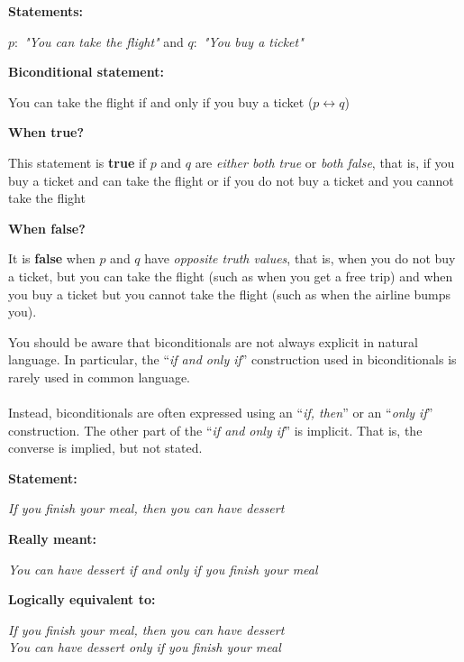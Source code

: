 \begin{tcolorbox}[title=Example of biconditional statement]
\textbf{Statements:}  
\begin{center}
$p:$ \textit{"You can take the flight"} and   $q:$ \textit{"You buy a ticket"}
\end{center}
\textbf{Biconditional statement:}
\begin{center}
You can take the flight if and only if you buy a ticket ($p \leftrightarrow q$)     
\end{center}
\textbf{When true?}
\begin{center}
This statement is \textbf{true} if $p$ and $q$ are \textit{either both true} or \textit{both false}, that is, if you buy a ticket and can take the flight or if you do not buy a ticket and you cannot take the flight     
\end{center}
\textbf{When false?} 
\begin{center}
It is \textbf{false} when
$p$ and $q$ have \textit{opposite truth values}, that is, when you do not buy a ticket, but you can take the flight (such as when you get a free trip) and when you buy a ticket but you cannot take the flight
(such as when the airline bumps you).   
\end{center}
\end{tcolorbox}
\begin{tcolorbox}[colback=white, colframe=gray!60, title=Remark 4]
You should be aware that biconditionals are not always explicit in natural language. In particular, the “\textit{if and only if}” construction used in biconditionals is rarely used in common language. \\ \\ Instead, biconditionals are often expressed
using an “\textit{if, then}” or an “\textit{only if}” construction. The other part of the “\textit{if and only if}” is implicit.
That is, the converse is implied, but not stated.
\end{tcolorbox}
\begin{tcolorbox}[title=Example of biconditional statement 2]
\textbf{Statement:}  
\begin{center}
\textit{If you finish your meal, then you can have dessert}
\end{center}
\textbf{Really meant:}
\begin{center}
\textit{You can have
dessert if and only if you finish your meal}  
\end{center}
\textbf{Logically equivalent to:}
\begin{center}
\textit{If you finish your meal, then you can have dessert} \\
\textit{You can have dessert
only if you finish your meal}
\end{center}  
\end{tcolorbox}
